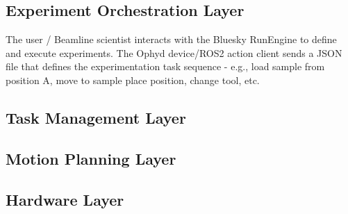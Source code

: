 \documentclass[12pt, a4paper]{article}
\begin{document}
\subsection{Experiment Orchestration Layer}
The user / Beamline scientist interacts with the Bluesky RunEngine to define and execute experiments. The Ophyd device/ROS2 action client sends a JSON file that defines the experimentation task sequence  - e.g., load sample from position A, move to sample place position, change tool, etc. 
\subsection{Task Management Layer}

\subsection{Motion Planning Layer}

\subsection{Hardware Layer}
\end{document}
